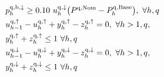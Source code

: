 \documentclass[conference]{IEEEtran}
\begin{document}
{\begin{subequations}
\begin{align}
        \  & p^{\rm{q},\rm{b}, \downarrow}_{h} \geq 0.10 \  u^{\rm{q},\downarrow}_{h} \big(P^{\rm{q},\rm{Nom}} - P^{\rm{q},\rm{Base}}_{h}\big), \                                                                                  \forall{h,q}                                                                             \label{power:14q}                                                                                                                                                                                                                               \\
        \  & u_{h-1}^{\rm{q},\uparrow} - u_{h}^{\rm{q},\uparrow} + y_{h}^{\rm{q},\uparrow} - z_{h}^{\rm{q},\uparrow} = 0, \    \forall{h>1,q},                                                                                                         \label{aux:1}                                                                                                                                                                                                                                                                                         \\
        \  & y_{h}^{\rm{q},\uparrow} + z_{h}^{\rm{q},\uparrow} \leq 1 \                                                             \forall{h,q}                                                                                                                                                                     \label{aux:2}                                                                                                                                                                                                                           \\
        \  & u_{h-1}^{\rm{q},\downarrow} - u_{h}^{\rm{q},\downarrow} + y_{h}^{\rm{q},\downarrow} - z_{h}^{\rm{q},\downarrow} = 0, \                                                                                                                                                                                                                                                    \forall{h>1,q},                                                                                                                                        \label{aux:3} \\
        \  & y_{h}^{\rm{q},\downarrow} + z_{h}^{\rm{q},\downarrow} \leq 1 \                                                         \forall{h,q}                                                                                                                                                                     \label{aux:4}                                                                                                                                                                                                                           \\

\end{align}
\end{subequations}}
\end{document}
